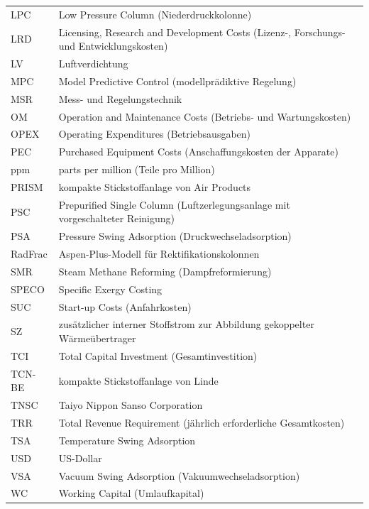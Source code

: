 \begin{longtable}{p{3cm}p{11cm}}
LPC & Low Pressure Column (Niederdruckkolonne) \\
LRD & Licensing, Research and Development Costs (Lizenz-, Forschungs- und Entwicklungskosten) \\
LV & Luftverdichtung \\
MPC & Model Predictive Control (modellprädiktive Regelung) \\
MSR & Mess- und Regelungstechnik \\
OM & Operation and Maintenance Costs (Betriebs- und Wartungskosten) \\
OPEX & Operating Expenditures (Betriebsausgaben) \\
PEC & Purchased Equipment Costs (Anschaffungskosten der Apparate) \\
ppm & parts per million (Teile pro Million) \\
PRISM & kompakte Stickstoffanlage von Air Products \\
PSC & Prepurified Single Column (Luftzerlegungsanlage mit vorgeschalteter Reinigung) \\
PSA & Pressure Swing Adsorption (Druckwechseladsorption) \\
RadFrac & Aspen-Plus-Modell für Rektifikationskolonnen \\
SMR & Steam Methane Reforming (Dampfreformierung) \\
SPECO & Specific Exergy Costing \\
SUC & Start-up Costs (Anfahrkosten) \\
SZ & zusätzlicher interner Stoffstrom zur Abbildung gekoppelter Wärmeübertrager \\
TCI & Total Capital Investment (Gesamtinvestition) \\
TCN-BE & kompakte Stickstoffanlage von Linde \\
TNSC & Taiyo Nippon Sanso Corporation \\
TRR & Total Revenue Requirement (jährlich erforderliche Gesamtkosten) \\
TSA & Temperature Swing Adsorption \\
USD & US-Dollar \\
VSA & Vacuum Swing Adsorption (Vakuumwechseladsorption) \\
WC & Working Capital (Umlaufkapital) \\
\end{longtable}

